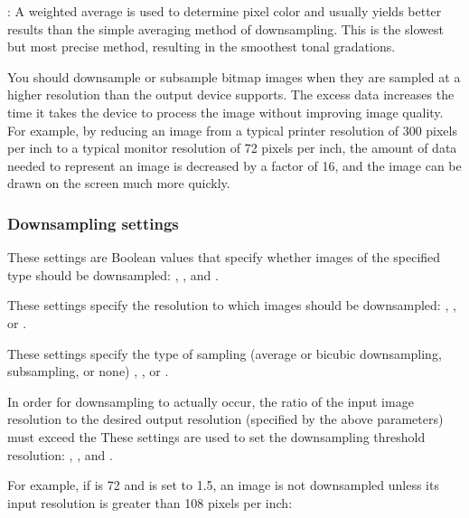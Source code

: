 \documentclass[letterpaper,12pt,english,openany,oneside]{sphinxmanual}
\begin{document}
 : A weighted average is used to determine pixel color and usually yields better results than the simple averaging method of downsampling. This is the slowest but most precise method, resulting in the smoothest tonal gradations.

You should downsample or subsample bitmap images when they are sampled at a higher resolution than the output device supports. The excess data increases the time it takes the device to process the image without improving image quality. For example, by reducing an image from a typical printer resolution of 300 pixels per inch to a typical monitor resolution of 72 pixels per inch, the amount of data needed to represent an image is decreased by a factor of 16, and the image can be drawn on the screen much more quickly.


\subsubsection{Downsampling settings}
\label{\detokenize{PDF_Create_UsingSettings:downsampling-settings}}
These settings are Boolean values that specify whether images of the specified type should be downsampled:  ,  , and  .

These settings specify the resolution to which images should be downsampled:  ,  , or  .

These settings specify the type of sampling (average or bicubic downsampling, subsampling, or none)  ,  , or  .

In order for downsampling to actually occur, the ratio of the input image resolution to the desired output resolution (specified by the above parameters) must exceed the  These settings are used to set the downsampling threshold resolution:  ,  , and  .

For example, if  is 72 and  is set to 1.5, an image is not downsampled unless its input resolution is greater than 108 pixels per inch:
\end{document}
